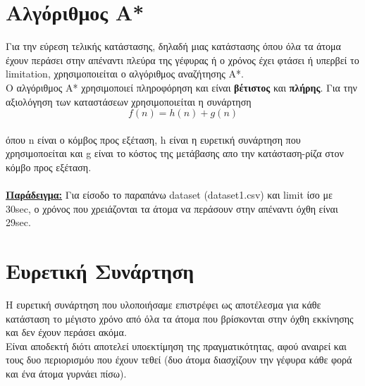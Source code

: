 \documentclass[12pt]{article}
\begin{document}
\section*{Αλγόριθμος A*}
Για την εύρεση τελικής κατάστασης, δηλαδή μιας κατάστασης όπου όλα τα άτομα έχουν περάσει στην απέναντι πλεύρα της γέφυρας ή ο χρόνος έχει φτάσει ή υπερβεί το limitation, χρησιμοποιείται ο αλγόριθμος αναζήτησης A*.\\
Ο αλγόριθμος Α* χρησιμοποιεί πληροφόρηση και είναι \textbf{βέτιστος} και \textbf{πλήρης}. Για την αξιολόγηση των καταστάσεων χρησιμοποιείται η συνάρτηση
 \begin{equation*}
        f(n) = h(n) + g(n)
\end{equation*}\\
όπου n είναι ο κόμβος προς εξέταση, h είναι η ευρετική συνάρτηση που χρησιμοποείται και g είναι το κόστος της μετάβασης απο την κατάσταση-ρίζα στον κόμβο προς εξέταση.\\\\
\textbf{\underline{Παράδειγμα:}} Για είσοδο το παραπάνω dataset (dataset1.csv) και limit ίσο με 30sec, ο χρόνος που χρειάζονται τα άτομα να περάσουν στην απέναντι όχθη είναι 29sec.
\section*{Ευρετική Συνάρτηση}
Η ευρετική συνάρτηση που υλοποιήσαμε επιστρέφει ως αποτέλεσμα για κάθε κατάσταση το μέγιστο χρόνο από όλα τα άτομα που βρίσκονται στην όχθη εκκίνησης και δεν έχουν περάσει ακόμα.\\
Είναι αποδεκτή διότι αποτελεί υποεκτίμηση της πραγματικότητας, αφού αναιρεί και τους δυο περιορισμόυ που έχουν τεθεί (δυο άτομα διασχίζουν την γέφυρα κάθε φορά και ένα άτομα γυρνάει πίσω).
\end{document}
